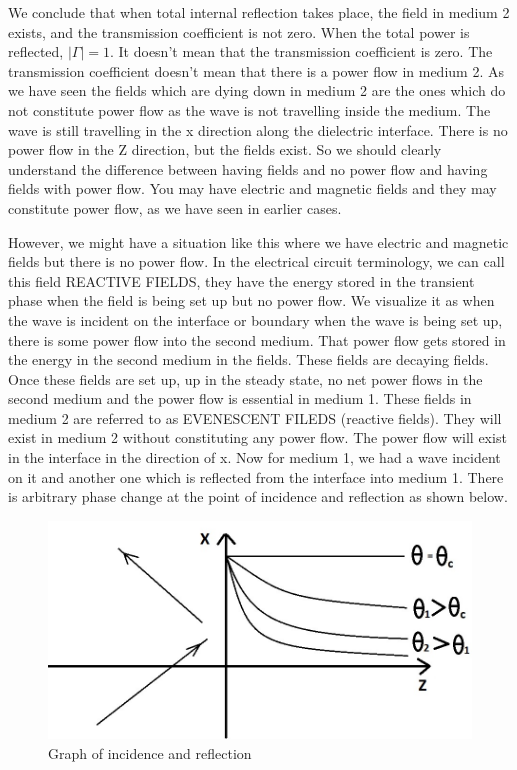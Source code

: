 We conclude that when total internal reflection takes place, the field in medium 2 exists, and the transmission coefficient is not zero. When the total power is reflected, $|\Gamma| = 1$. It doesn't mean that the transmission coefficient is zero. The transmission coefficient doesn't mean that there is a power flow in medium 2. As we have seen the fields which are dying down in medium 2 are the ones which do not constitute power flow as the wave is not travelling inside the medium. The wave is still travelling in the x direction along the dielectric interface. There is no power flow in the Z direction, but the fields exist. So we should clearly understand the difference between having fields and no power flow and having fields with power flow. You may have electric and magnetic fields and they may constitute power flow, as we have seen in earlier cases.

However, we might have a situation like this where we have electric and magnetic fields but there is no power flow. In the electrical circuit terminology, we can call this field REACTIVE FIELDS, they have the energy stored in the transient phase when the field is being set up but no power flow. We visualize it as when the wave is incident on the interface or boundary when the wave is being set up, there is some power flow into the second medium. That power flow gets stored in the energy in the second medium in the fields. These fields are decaying fields. Once these fields are set up, up in the steady state, no net power flows in the second medium and the power flow is essential in medium 1. These fields in medium 2 are referred to as EVENESCENT FILEDS (reactive fields). They will exist in medium 2 without constituting any power flow. The power flow will exist in the interface in the direction of x. Now for medium 1, we had a wave incident on it and another one which is reflected from the interface into medium 1. There is arbitrary phase change at the point of incidence and reflection as shown below.
\begin{figure}[h]
\centering
\includegraphics[width=.7\linewidth]{./graphics/fig323}
\caption{Graph of incidence and reflection}
\end{figure}

